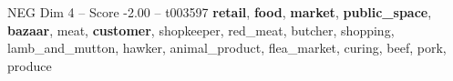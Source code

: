 \begin{textsample}{NEG Dim 4 – Score -2.00 – t003597}  \label{ex:f4_neg_023}
\textbf{retail}, \textbf{food}, \textbf{market}, \textbf{public\_space}, \textbf{bazaar}, meat, \textbf{customer}, shopkeeper, red\_meat, butcher, shopping, lamb\_and\_mutton, hawker, animal\_product, flea\_market, curing, beef, pork, produce

\end{textsample}
